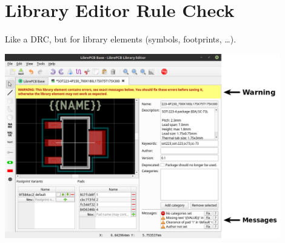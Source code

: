 \section{Library Editor Rule Check}

\begin{frame}{\secname}

  Like a DRC, but for library elements (symbols, footprints, \ldots).

  \begin{center}
    \includegraphics[width=0.9\textwidth]{images/library_element_check.png}
  \end{center}

\end{frame}


%
%
%
%
